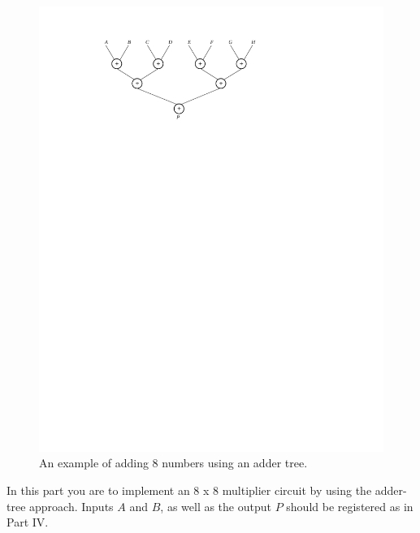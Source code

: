 \documentclass[epsfig,10pt,fullpage]{article}
\newcommand{\CommonDocsPath}{../../../common/docs}
\begin{document}
\begin{figure}[H]
\centerline{
\includegraphics{figures/adder_tree}}
\caption{An example of adding 8 numbers using an adder tree.}
\label{fig:adder_tree}
\end{figure}

In this part you are to implement an 8 {\sf x} 8 multiplier circuit by using the adder-tree
approach. Inputs $A$ and $B$, as well as the output $P$ should be registered as in Part IV. 



\end{document}
